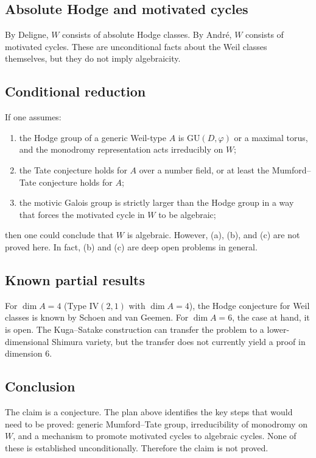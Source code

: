 \documentclass{article}
\begin{document}
\subsection*{Absolute Hodge and motivated cycles}
By Deligne, $W$ consists of absolute Hodge classes. By Andr\'e, $W$ consists of
motivated cycles. These are unconditional facts about the Weil classes themselves,
but they do not imply algebraicity.

\subsection*{Conditional reduction}
If one assumes:
\begin{enumerate}
\item[(a)] the Hodge group of a generic Weil-type $A$ is $\mathrm{GU}(D,\varphi)$ or a
maximal torus, and the monodromy representation acts irreducibly on $W$;
\item[(b)] the Tate conjecture holds for $A$ over a number field, or at least the
Mumford--Tate conjecture holds for $A$;
\item[(c)] the motivic Galois group is strictly larger than the Hodge group in a way
that forces the motivated cycle in $W$ to be algebraic;
\end{enumerate}
then one could conclude that $W$ is algebraic. However, (a), (b), and (c) are not
proved here. In fact, (b) and (c) are deep open problems in general.

\subsection*{Known partial results}
For $\dim A = 4$ (Type IV$(2,1)$ with $\dim A = 4$), the Hodge conjecture for Weil
classes is known by Schoen and van Geemen. For $\dim A = 6$, the case at hand, it is
open. The Kuga--Satake construction can transfer the problem to a lower-dimensional
Shimura variety, but the transfer does not currently yield a proof in dimension $6$.

\subsection*{Conclusion}
The claim is a conjecture. The plan above identifies the key steps that would need to
be proved: generic Mumford--Tate group, irreducibility of monodromy on $W$, and a
mechanism to promote motivated cycles to algebraic cycles. None of these is
established unconditionally. Therefore the claim is not proved.
\end{document}

